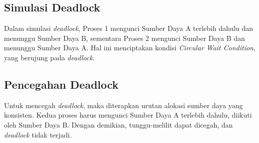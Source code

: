\documentclass[12pt]{article}
\begin{document}
\subsection*{Simulasi Deadlock}

Dalam simulasi \textit{deadlock}, Proses 1 mengunci Sumber Daya A terlebih dahulu dan menunggu Sumber Daya B, sementara Proses 2 mengunci Sumber Daya B dan menunggu Sumber Daya A. Hal ini menciptakan kondisi \textit{Circular Wait Condition}, yang berujung pada \textit{deadlock}.

\subsection*{Pencegahan Deadlock}

Untuk mencegah \textit{deadlock}, maka diterapkan urutan alokasi sumber daya yang konsisten. Kedua proses harus mengunci Sumber Daya A terlebih dahulu, diikuti oleh Sumber Daya B. Dengan demikian, tunggu-melilit dapat dicegah, dan \textit{deadlock} tidak terjadi.
\vspace{10pt}

\end{document}
